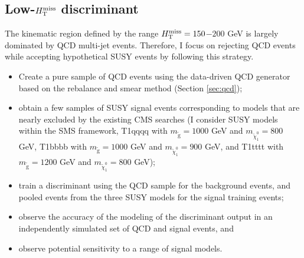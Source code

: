\subsection{Low-$H_{\text{T}}^{\rm miss}$ discriminant}
The kinematic region defined by the range $H_{\text{T}}^{\rm miss}=150$$-$$200$ GeV is largely dominated by QCD multi-jet events. Therefore, I focus on rejecting QCD events while accepting hypothetical SUSY events by following this strategy.
\begin{itemize}
\item Create a pure sample of QCD events using the data-driven QCD generator based on the rebalance and smear method (Section \ref{sec:qcd});
\item obtain a few samples of SUSY signal events corresponding to models that are nearly excluded by the existing CMS searches (I consider SUSY models within the SMS framework, T1qqqq with $m_{\tilde{\text{g}}}=1000$ GeV and $m_{\tilde{\chi}^{0}_{1}}=800$ GeV,  T1bbbb with $m_{\tilde{\text{g}}}=1000$ GeV and $m_{\tilde{\chi}^{0}_{1}}=900$ GeV, and T1tttt with $m_{\tilde{\text{g}}}=1200$ GeV and $m_{\tilde{\chi}^{0}_{1}}=800$ GeV);
\item train a discriminant using the QCD sample for the background events, and pooled events from the three SUSY models for the signal training events;
\item observe the accuracy of the modeling of the discriminant output in an independently simulated set of QCD and signal events, and
\item observe potential sensitivity to a range of signal models.
\end{itemize}

